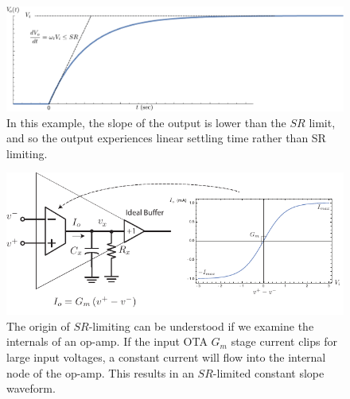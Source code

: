 \begin{figure}[H]
\centering
\includegraphics[width=\columnwidth]{SR_case2}
\caption{In this example, the slope of the output is lower than the $SR$ limit, and so the output experiences linear settling time rather than SR limiting.}
\label{fig:SR_case2}
\end{figure}
\newpage
\begin{figure}[t]
\centering
\includegraphics[width=\columnwidth]{opamp_ota_SR}
\caption{The origin of $SR$-limiting can be understood if we examine the internals of an op-amp. If the input OTA $G_m$ stage current clips for large input voltages, a constant current will flow into the internal node of the op-amp.  This results in an $SR$-limited constant slope waveform.}
\label{fig:opamp_ota_SR}
\end{figure}
